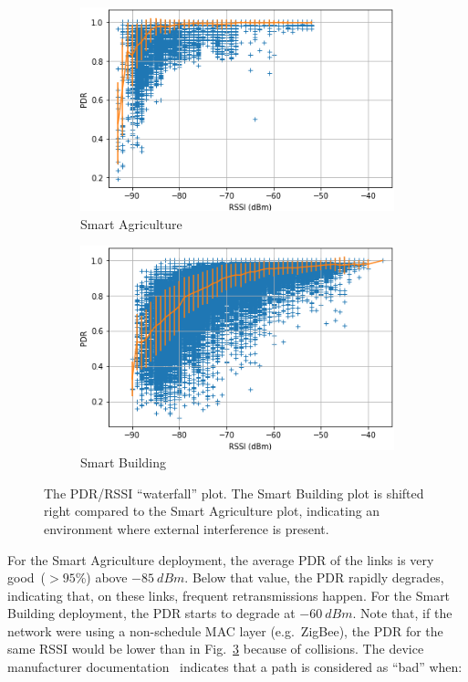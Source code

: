 \documentclass{elsarticle}
\newcommand{\building}            {Smart Building\xspace}
\newcommand{\agri}                {Smart Agriculture\xspace}
\begin{document}
\begin{figure}
    \centering
    \begin{subfigure}[h]{0.49\textwidth}
        \includegraphics[width=\columnwidth]{waterfall_agri.png}
        \caption{\agri}
        \label{fig:waterfall_agri}
     \end{subfigure}
     \begin{subfigure}[h]{0.49\textwidth} 
        \includegraphics[width=\columnwidth]{waterfall_building.png}
        \caption{\building}
        \label{fig:waterfall_building}
    \end{subfigure}
    \caption{
        The PDR/RSSI ``waterfall'' plot.
        The \building plot is shifted right compared to the \agri plot, indicating an environment where external interference is present.
    }
    \label{fig:waterfall}
\end{figure}

For the \agri deployment, the average PDR of the links is very good~($>95$\%) above $-85~dBm$.
Below that value, the PDR rapidly degrades, indicating that, on these links, frequent retransmissions happen.
For the \building deployment, the PDR starts to degrade at $-60~dBm$.
Note that, if the network were using a non-schedule MAC layer (e.g.~ZigBee), the PDR for the same RSSI would be lower than in Fig.~\ref{fig:waterfall} because of collisions.
The device manufacturer documentation~\cite{smip_app_note} indicates that a path is considered as ``bad'' when:
\end{document}

